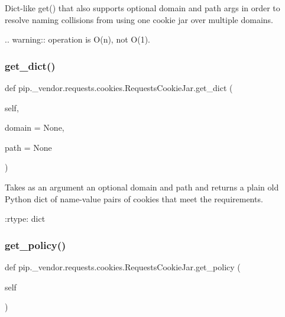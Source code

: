 \begin{DoxyVerb}Dict-like get() that also supports optional domain and path args in
order to resolve naming collisions from using one cookie jar over
multiple domains.

.. warning:: operation is O(n), not O(1).
\end{DoxyVerb}
 \mbox{\label{classpip_1_1__vendor_1_1requests_1_1cookies_1_1RequestsCookieJar_a791232395c3784d13c877e5d07cfa588}} 
\subsubsection{\texorpdfstring{get\+\_\+dict()}{get\_dict()}}
{\footnotesize\ttfamily def pip.\+\_\+vendor.\+requests.\+cookies.\+Requests\+Cookie\+Jar.\+get\+\_\+dict (\begin{DoxyParamCaption}\item[{}]{self,  }\item[{}]{domain = {\ttfamily None},  }\item[{}]{path = {\ttfamily None} }\end{DoxyParamCaption})}

\begin{DoxyVerb}Takes as an argument an optional domain and path and returns a plain
old Python dict of name-value pairs of cookies that meet the
requirements.

:rtype: dict
\end{DoxyVerb}
 \mbox{\label{classpip_1_1__vendor_1_1requests_1_1cookies_1_1RequestsCookieJar_ad3917887bdfcc30114600741f7c0208c}} 
\subsubsection{\texorpdfstring{get\+\_\+policy()}{get\_policy()}}
{\footnotesize\ttfamily def pip.\+\_\+vendor.\+requests.\+cookies.\+Requests\+Cookie\+Jar.\+get\+\_\+policy (\begin{DoxyParamCaption}\item[{}]{self }\end{DoxyParamCaption})}

